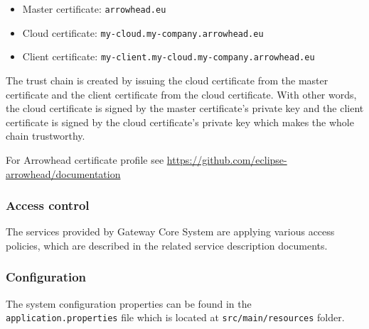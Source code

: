 \documentclass[a4paper]{arrowhead}
\begin{document}
\begin{itemize}
    \item Master certificate: \texttt{arrowhead.eu}
    \item Cloud certificate: \texttt{my-cloud.my-company.arrowhead.eu}
    \item Client certificate: \texttt{my-client.my-cloud.my-company.arrowhead.eu}
\end{itemize}

The trust chain is created by issuing the cloud certificate from the master certificate and the client certificate from the cloud certificate. With other words, the cloud certificate is signed by the master certificate's private key and the client certificate is signed by the cloud certificate's private key which makes the whole chain trustworthy.

For Arrowhead certificate profile see \url{https://github.com/eclipse-arrowhead/documentation}

\subsubsection {Access control}
The services provided by Gateway Core System are applying various access policies, which are described in the related service description documents.

\subsubsection {Configuration}
   
The system configuration properties can be found in the \texttt{application.properties} file which is located at \texttt{src/main/resources} folder.
\end{document}

